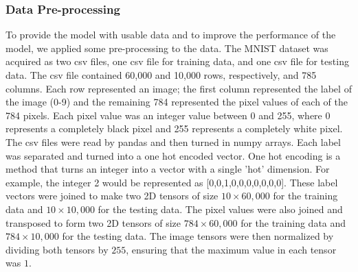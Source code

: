 \documentclass[twocolumn,pra,floatfix]{revtex4-2}
\begin{document}
            \subsubsection{Data Pre-processing}
                To provide the model with usable data and to improve the performance of the model, we applied some pre-processing to the data. The MNIST dataset was acquired as two csv files, one csv file for training data, and one csv file for testing data. The csv file contained 60,000 and 10,000 rows, respectively, and 785 columns. Each row represented an image; the first column represented the label of the image (0-9) and the remaining 784 represented the pixel values of each of the 784 pixels. Each pixel value was an integer value between 0 and 255, where 0 represents a completely black pixel and 255 represents a completely white pixel. The csv files were read by pandas and then turned in numpy arrays. Each label was separated and turned into a one hot encoded vector. One hot encoding is a method that turns an integer into a vector with a single 'hot' dimension. For example, the integer 2 would be represented as [0,0,1,0,0,0,0,0,0,0]. These label vectors were joined to make two 2D tensors of size $10 \times 60,000$ for the training data and $10 \times 10,000$ for the testing data. The pixel values were also joined and transposed to form two 2D tensors of size $784 \times 60,000$ for the training data and $784 \times 10,000$ for the testing data. The image tensors were then normalized by dividing both tensors by $255$, ensuring that the maximum value in each tensor was $1$.
\end{document}
